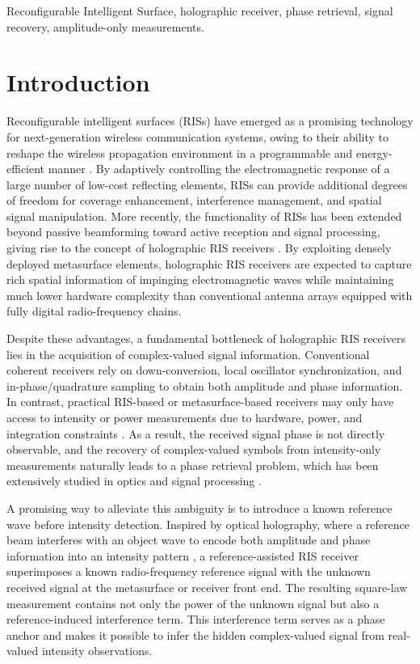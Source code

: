 \documentclass[journal]{IEEEtran}
\begin{document}
\begin{IEEEkeywords}
Reconfigurable Intelligent Surface, holographic receiver, phase retrieval, signal recovery, amplitude-only measurements.
\end{IEEEkeywords}

\section{Introduction}
\label{sec:introduction}

Reconfigurable intelligent surfaces (RISs) have emerged as a promising technology for next-generation wireless communication systems, owing to their ability to reshape the wireless propagation environment in a programmable and energy-efficient manner \cite{wu2019intelligent, di2019reconfigurable}. By adaptively controlling the electromagnetic response of a large number of low-cost reflecting elements, RISs can provide additional degrees of freedom for coverage enhancement, interference management, and spatial signal manipulation. More recently, the functionality of RISs has been extended beyond passive beamforming toward active reception and signal processing, giving rise to the concept of holographic RIS receivers \cite{zhang2021holographic}. By exploiting densely deployed metasurface elements, holographic RIS receivers are expected to capture rich spatial information of impinging electromagnetic waves while maintaining much lower hardware complexity than conventional antenna arrays equipped with fully digital radio-frequency chains.

Despite these advantages, a fundamental bottleneck of holographic RIS receivers lies in the acquisition of complex-valued signal information. Conventional coherent receivers rely on down-conversion, local oscillator synchronization, and in-phase/quadrature sampling to obtain both amplitude and phase information. In contrast, practical RIS-based or metasurface-based receivers may only have access to intensity or power measurements due to hardware, power, and integration constraints \cite{shen2020intelligent}. As a result, the received signal phase is not directly observable, and the recovery of complex-valued symbols from intensity-only measurements naturally leads to a phase retrieval problem, which has been extensively studied in optics and signal processing \cite{candes2015phase, shechtman2015phase}.

A promising way to alleviate this ambiguity is to introduce a known reference wave before intensity detection. Inspired by optical holography, where a reference beam interferes with an object wave to encode both amplitude and phase information into an intensity pattern \cite{gabor1948new}, a reference-assisted RIS receiver superimposes a known radio-frequency reference signal with the unknown received signal at the metasurface or receiver front end. The resulting square-law measurement contains not only the power of the unknown signal but also a reference-induced interference term. This interference term serves as a phase anchor and makes it possible to infer the hidden complex-valued signal from real-valued intensity observations.
\end{document}
